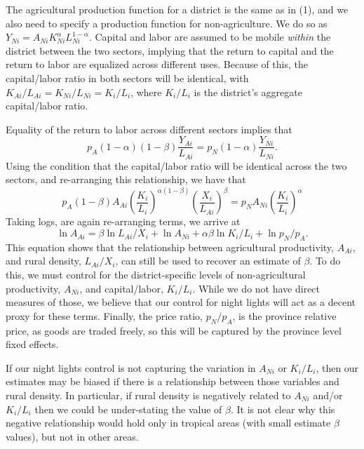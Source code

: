 \documentclass[11pt]{article}
\begin{document}
The agricultural production function for a district is the same as in (1), and we also need to specify a production function for non-agriculture. We do so as $Y_{Ni} = A_{Ni} K_{Ni}^{\alpha} L_{Ni}^{1-\alpha}$. Capital and labor are assumed to be mobile \textit{within} the district between the two sectors, implying that the return to capital and the return to labor are equalized across different uses. Because of this, the capital/labor ratio in both sectors will be identical, with $K_{Ai}/L_{Ai} = K_{Ni}/L_{Ni} = K_i/L_i$, where $K_i/L_i$ is the district's aggregate capital/labor ratio. 

Equality of the return to labor across different sectors implies that 
\begin{equation}
    p_A (1-\alpha)(1-\beta)\frac{Y_{Ai}}{L_{Ai}} = p_N (1-\alpha)\frac{Y_{Ni}}{L_{Ni}}. \nonumber
\end{equation}
Using the condition that the capital/labor ratio will be identical across the two sectors, and re-arranging this relationship, we have that
\begin{equation}
    p_A (1-\beta) A_{Ai} \left(\frac{K_i}{L_i}\right)^{\alpha(1-\beta)} \left(\frac{X_i}{L_{Ai}}\right)^{\beta} = p_N A_{Ni} \left(\frac{K_i}{L_i}\right)^{\alpha} \nonumber
\end{equation}
Taking logs, are again re-arranging terms, we arrive at
\begin{equation}
    \ln A_{Ai} = \beta \ln L_{Ai}/X_i + \ln A_{Ni} + \alpha\beta \ln K_i/L_i + \ln p_N/p_A. \nonumber
\end{equation}
This equation shows that the relationship between agricultural productivity, $A_{Ai}$, and rural density, $L_{Ai}/X_i$, can still be used to recover an estimate of $\beta$. To do this, we must control for the district-specific levels of non-agricultural productivity, $A_{Ni}$, and capital/labor, $K_i/L_i$. While we do not have direct measures of those, we believe that our control for night lights will act as a decent proxy for these terms. Finally, the price ratio, $p_N/p_A$, is the province relative price, as goods are traded freely, so this will be captured by the province level fixed effects.

If our night lights control is not capturing the variation in $A_{Ni}$ or $K_i/L_i$, then our estimates may be biased if there is a relationship between those variables and rural density. In particular, if rural density is negatively related to $A_{Ni}$ and/or $K_i/L_i$ then we could be under-stating the value of $\beta$. It is not clear why this negative relationship would hold only in tropical areas (with small estimate $\beta$ values), but not in other areas.
\end{document}
